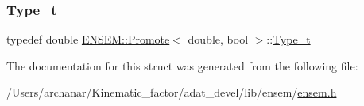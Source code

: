 \subsubsection{\texorpdfstring{Type\_t}{Type\_t}\hspace{0.1cm}{\footnotesize\ttfamily [2/2]}}
{\footnotesize\ttfamily typedef double \mbox{\hyperlink{structENSEM_1_1Promote}{E\+N\+S\+E\+M\+::\+Promote}}$<$ double, bool $>$\+::\mbox{\hyperlink{structENSEM_1_1Promote_3_01double_00_01bool_01_4_a14edc84a3688511a1539a90f9f319384}{Type\+\_\+t}}}



The documentation for this struct was generated from the following file\+:\begin{DoxyCompactItemize}
\item 
/\+Users/archanar/\+Kinematic\+\_\+factor/adat\+\_\+devel/lib/ensem/\mbox{\hyperlink{lib_2ensem_2ensem_8h}{ensem.\+h}}\end{DoxyCompactItemize}

